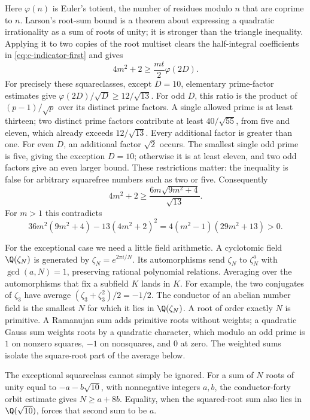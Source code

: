 Here $\varphi(n)$ is Euler's totient, the number of residues modulo $n$
that are coprime to $n$.
Larson's root-sum bound is a theorem about expressing a quadratic
irrationality as a sum of roots of unity; it is stronger than the
triangle inequality. Applying it to two copies of the root multiset
clears the half-integral coefficients in
\eqref{eq:c-indicator-first} and gives
\[
 4m^2+2\geq\frac{mt}{2}\varphi(2D).
\]
For precisely these squareclasses, except $D=10$, elementary
prime-factor estimates give
$\varphi(2D)/\sqrt D\geq12/\sqrt{13}$.
For odd $D$, this ratio is the product of
$(p-1)/\sqrt p$ over its distinct prime factors. A single allowed
prime is at least thirteen; two distinct prime factors contribute
at least $40/\sqrt{55}$, from five and eleven, which already
exceeds $12/\sqrt{13}$. Every additional factor is greater than one.
For even $D$, an additional factor $\sqrt2$ occurs. The smallest
single odd prime is five, giving the exception $D=10$; otherwise
it is at least eleven, and two odd factors give an even larger bound.
These restrictions matter: the inequality is false for arbitrary
squarefree numbers such as two or five. Consequently
\[
 4m^2+2\geq\frac{6m\sqrt{9m^2+4}}{\sqrt{13}}.
\]
For $m>1$ this contradicts
\[
 36m^2(9m^2+4)-13(4m^2+2)^2
                   =4(m^2-1)(29m^2+13)>0.
\]

For the exceptional case we need a little field arithmetic.
A cyclotomic field $\Q(\zeta_N)$ is generated by
$\zeta_N=e^{2\pi i/N}$. Its automorphisms send $\zeta_N$ to
$\zeta_N^a$ with $\gcd(a,N)=1$, preserving rational polynomial
relations. Averaging over the automorphisms that fix a subfield $K$
lands in $K$. For example, the two conjugates of $\zeta_3$ have
average $(\zeta_3+\zeta_3^2)/2=-1/2$.
The conductor of an abelian number field is the smallest $N$ for
which it lies in $\Q(\zeta_N)$. A root of order exactly $N$ is
primitive. A Ramanujan sum adds primitive roots without weights;
a quadratic Gauss sum weights roots by a quadratic character,
which modulo an odd prime is $1$ on nonzero squares, $-1$ on
nonsquares, and $0$ at zero. The weighted sums isolate the
square-root part of the average below.

The exceptional squareclass cannot simply be ignored. For a sum of
$N$ roots of unity equal to $-a-b\sqrt{10}$, with nonnegative
integers $a,b$, the conductor-forty orbit estimate gives
$N\geq a+8b$. Equality, when the squared-root sum also lies in
$\Q(\sqrt{10})$, forces that second sum to be $a$.


